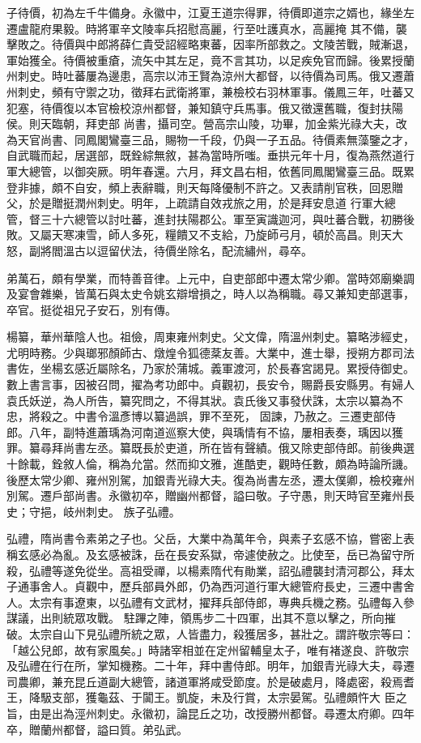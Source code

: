 \begin{pinyinscope}
 子待價，初為左千牛備身。永徽中，江夏王道宗得罪，待價即道宗之婿也，緣坐左遷盧龍府果毅。時將軍辛文陵率兵招慰高麗，行至吐護真水，高麗掩
 其不備，襲擊敗之。待價與中郎將薛仁貴受詔經略東蕃，因率所部救之。文陵苦戰，賊漸退，軍始獲全。待價被重瘡，流矢中其左足，竟不言其功，以足疾免官而歸。後累授蘭州刺史。時吐蕃屢為邊患，高宗以沛王賢為涼州大都督，以待價為司馬。俄又遷蕭州刺史，頻有守禦之功，徵拜右武衛將軍，兼檢校右羽林軍事。儀鳳三年，吐蕃又犯塞，待價復以本官檢校涼州都督，兼知鎮守兵馬事。俄又徵還舊職，復封扶陽侯。則天臨朝，拜吏部
 尚書，攝司空。營高宗山陵，功畢，加金紫光祿大夫，改為天官尚書、同鳳閣鸞臺三品，賜物一千段，仍與一子五品。待價素無藻鑒之才，自武職而起，居選部，既銓綜無敘，甚為當時所嗤。垂拱元年十月，復為燕然道行軍大總管，以御突厥。明年春還。六月，拜文昌右相，依舊同鳳閣鸞臺三品。既累登非據，頗不自安，頻上表辭職，則天每降優制不許之。又表請削官秩，回恩贈父，於是贈挺潤州刺史。明年，上疏請自效戎旅之用，於是拜安息道
 行軍大總管，督三十六總管以討吐蕃，進封扶陽郡公。軍至寅識迦河，與吐蕃合戰，初勝後敗。又屬天寒凍雪，師人多死，糧饋又不支給，乃旋師弓月，頓於高昌。則天大怒，副將閻溫古以逗留伏法，待價坐除名，配流繡州，尋卒。



 弟萬石，頗有學業，而特善音律。上元中，自吏部郎中遷太常少卿。當時郊廟樂調及宴會雜樂，皆萬石與太史令姚玄辯增損之，時人以為稱職。尋又兼知吏部選事，卒官。挺從祖兄子安石，別有傳。



 楊纂，華州華陰人也。祖儉，周東雍州刺史。父文偉，隋溫州刺史。纂略涉經史，尤明時務。少與瑯邪顏師古、燉煌令狐德棻友善。大業中，進士舉，授朔方郡司法書佐，坐楊玄感近屬除名，乃家於蒲城。義軍渡河，於長春宮謁見。累授侍御史。數上書言事，因被召問，擢為考功郎中。貞觀初，長安令，賜爵長安縣男。有婦人袁氏妖逆，為人所告，纂究問之，不得其狀。袁氏後又事發伏誅，太宗以纂為不忠，將殺之。中書令溫彥博以纂過誤，罪不至死，
 固諫，乃赦之。三遷吏部侍郎。八年，副特進蕭瑀為河南道巡察大使，與瑀情有不協，屢相表奏，瑀因以獲罪。纂尋拜尚書左丞。纂既長於吏道，所在皆有聲績。俄又除吏部侍郎。前後典選十餘載，銓敘人倫，稱為允當。然而抑文雅，進酷吏，觀時任數，頗為時論所譏。後歷太常少卿、雍州別駕，加銀青光祿大夫。復為尚書左丞，遷太僕卿，檢校雍州別駕。遷戶部尚書。永徽初卒，贈幽州都督，謚曰敬。子守愚，則天時官至雍州長史；守挹，岐州刺史。
 族子弘禮。



 弘禮，隋尚書令素弟之子也。父岳，大業中為萬年令，與素子玄感不協，嘗密上表稱玄感必為亂。及玄感被誅，岳在長安系獄，帝遽使赦之。比使至，岳已為留守所殺，弘禮等遂免從坐。高祖受禪，以楊素隋代有勛業，詔弘禮襲封清河郡公，拜太子通事舍人。貞觀中，歷兵部員外郎，仍為西河道行軍大總管府長史，三遷中書舍人。太宗有事遼東，以弘禮有文武材，擢拜兵部侍郎，專典兵機之務。弘禮每入參謀議，出則統眾攻戰。
 駐蹕之陣，領馬步二十四軍，出其不意以擊之，所向摧破。太宗自山下見弘禮所統之眾，人皆盡力，殺獲居多，甚壯之。謂許敬宗等曰：「越公兒郎，故有家風矣。」時諸宰相並在定州留輔皇太子，唯有褚遂良、許敬宗及弘禮在行在所，掌知機務。二十年，拜中書侍郎。明年，加銀青光祿大夫，尋遷司農卿，兼充昆丘道副大總管，諸道軍將咸受節度。於是破處月，降處密，殺焉耆王，降馺支部，獲龜茲、于闐王。凱旋，未及行賞，太宗晏駕。弘禮頗忤大
 臣之旨，由是出為涇州刺史。永徽初，論昆丘之功，改授勝州都督。尋遷太府卿。四年卒，贈蘭州都督，謚曰質。弟弘武。




\end{pinyinscope}

